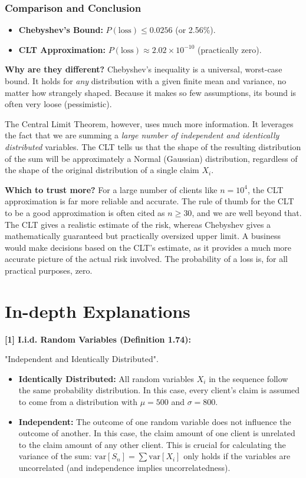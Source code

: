 \documentclass[11pt,a4paper]{article}
\begin{document}
\subsubsection{Comparison and Conclusion}
\begin{itemize}
    \item \textbf{Chebyshev's Bound:} $P(\text{loss}) \le 0.0256$ (or 2.56\%).
    \item \textbf{CLT Approximation:} $P(\text{loss}) \approx 2.02 \times 10^{-10}$ (practically zero).
\end{itemize}

\textbf{Why are they different?}
Chebyshev's inequality is a universal, worst-case bound. It holds for \textit{any} distribution with a given finite mean and variance, no matter how strangely shaped. Because it makes so few assumptions, its bound is often very loose (pessimistic).

The Central Limit Theorem, however, uses much more information. It leverages the fact that we are summing a \textit{large number of independent and identically distributed} variables. The CLT tells us that the shape of the resulting distribution of the sum will be approximately a Normal (Gaussian) distribution, regardless of the shape of the original distribution of a single claim $X_i$.

\textbf{Which to trust more?}
For a large number of clients like $n=10^4$, the CLT approximation is far more reliable and accurate. The rule of thumb for the CLT to be a good approximation is often cited as $n \ge 30$, and we are well beyond that. The CLT gives a realistic estimate of the risk, whereas Chebyshev gives a mathematically guaranteed but practically oversized upper limit. A business would make decisions based on the CLT's estimate, as it provides a much more accurate picture of the actual risk involved. The probability of a loss is, for all practical purposes, zero.

\newpage
\section*{In-depth Explanations}
\hypertarget{note1}{\textbf{[1] I.i.d. Random Variables (Definition 1.74):}}
"Independent and Identically Distributed".
\begin{itemize}
    \item \textbf{Identically Distributed:} All random variables $X_i$ in the sequence follow the same probability distribution. In this case, every client's claim is assumed to come from a distribution with $\mu=500$ and $\sigma=800$.
    \item \textbf{Independent:} The outcome of one random variable does not influence the outcome of another. In this case, the claim amount of one client is unrelated to the claim amount of any other client. This is crucial for calculating the variance of the sum: $\text{var}[S_n] = \sum \text{var}[X_i]$ only holds if the variables are uncorrelated (and independence implies uncorrelatedness).
\end{itemize}
\end{document}
